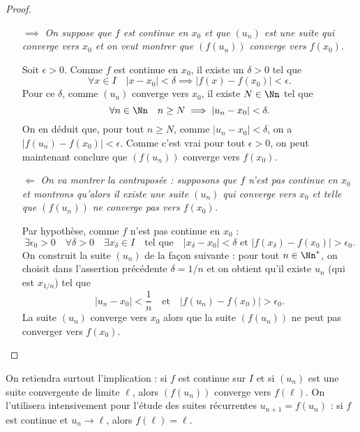 \documentclass[class=report,crop=false]{standalone}
\begin{document}
\begin{proof}~
\begin{itemize}
  \item[$\implies$]
  \emph{On suppose que $f$ est continue en $x_0$ et que $(u_n)$ est une suite qui
  converge vers $x_0$ et on veut montrer que $(f(u_n))$ converge vers $f(x_0)$.}

  Soit $\epsilon >0$. Comme $f$ est continue en $x_0$, il existe un $\delta>0$ tel que
\[
\forall x \in I \quad  |x-x_0|<\delta \implies |f(x)-f(x_0)|<\epsilon.
\]
Pour ce $\delta$, comme $(u_n)$ converge vers $x_0$, il existe $N\in\Nn$ tel que
\[
\forall n\in \Nn \quad  n\geq N \implies |u_n-x_0|<\delta.
\]
On en déduit que, pour tout $n\geq N$, comme $|u_n-x_0|<\delta$, on a
$|f(u_n)-f(x_0)|<\epsilon$. Comme c'est vrai pour tout $\epsilon >0$, on peut maintenant conclure que $(f(u_n))$ converge vers $f(x_0)$.


  \item[$\Longleftarrow$] \emph{On va montrer la contraposée :
  supposons que $f$ n'est pas continue en $x_0$ et montrons qu'alors il existe
  une suite $(u_n)$ qui converge vers $x_0$ et telle que $(f(u_n))$ ne converge pas
  vers $f(x_0)$.}

  Par hypothèse, comme $f$ n'est pas continue en $x_0$ :
\[
\exists \epsilon_0>0 \quad \forall\delta>0 \quad \exists x_\delta \in I \quad
\text{tel que} \quad |x_\delta-x_0|<\delta \text{ et } |f(x_\delta)-f(x_0)|>\epsilon_0.
\]
On construit la suite $(u_n)$ de la façon suivante : pour tout $n\in \Nn^*$,
on choisit dans l'assertion précédente $\delta=1/n$ et on obtient qu'il existe $u_n$ (qui est $x_{1/n}$) tel que
\[
|u_n-x_0|<\frac1n \quad \text{et} \quad |f(u_n)-f(x_0)|>\epsilon_0.
\]
La suite $(u_n)$ converge vers $x_0$ alors que la suite $(f(u_n))$ ne peut pas converger vers $f(x_0)$.
\end{itemize}
\end{proof}

\begin{remarque*}
On retiendra surtout l'implication : si $f$ est continue sur $I$ et si $(u_n)$ est
une suite convergente de limite $\ell$, alors $(f(u_n))$ converge vers $f(\ell)$.
On l'utilisera intensivement pour l'étude des suites récurrentes $u_{n+1}= f(u_n)$ : si $f$ est
continue et $u_n\to \ell$, alors $f(\ell)=\ell$.
\end{remarque*}

\end{document}
